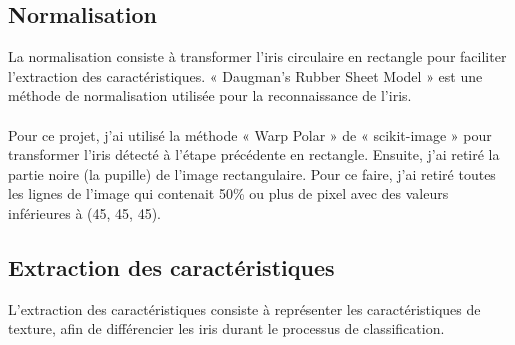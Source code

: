 \documentclass[12pt,twoside,letterpaper]{article}
\begin{document}
\subsection{Normalisation}
La normalisation consiste à transformer l’iris circulaire en rectangle pour faciliter l’extraction des caractéristiques. « Daugman’s Rubber Sheet Model » est une méthode de normalisation utilisée pour la reconnaissance de l’iris.\cite{ref_01}\cite{ref_06}
\\~\\
Pour ce projet, j'ai utilisé la méthode « Warp Polar » de « scikit-image » pour transformer l'iris détecté à l'étape précédente en rectangle. Ensuite, j'ai retiré la partie noire (la pupille) de l'image rectangulaire. Pour ce faire, j'ai retiré toutes les lignes de l'image qui contenait 50\% ou plus de pixel avec des valeurs inférieures à (45, 45, 45).

\subsection{Extraction des caractéristiques}
L’extraction des caractéristiques consiste à représenter les caractéristiques de texture, afin de différencier les iris durant le processus de classification.\cite{ref_01}\cite{ref_06}
\end{document}
